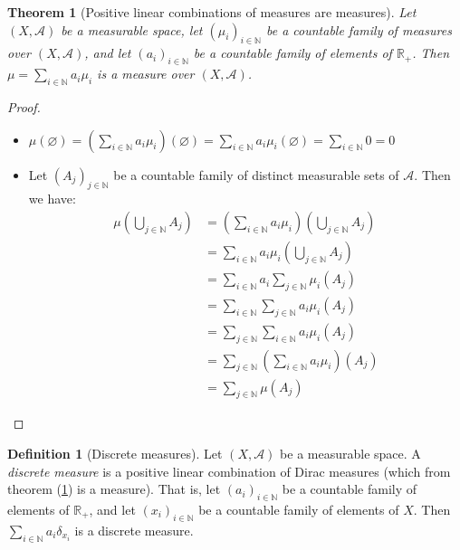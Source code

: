 \documentclass{article}
\newtheorem{theorem}{Theorem}[section]
\theoremstyle{definition}
\newtheorem{definition}{Definition}[section]
\theoremstyle{remark}
\theoremstyle{example}
\theoremstyle{notation}
\begin{document}
\begin{theorem}[Positive linear combinations of measures are measures] \label{thm:pos_lin_comb_measures}
    Let $(X, \mathcal{A})$ be a measurable space, let $(\mu_i)_{i \in \mathbb{N}}$ be a countable family of measures over $(X, \mathcal{A})$, and let $(a_i)_{i \in \mathbb{N}}$ be a countable family of elements of $\mathbb{R}_+$. Then $\mu = \sum_{i \in \mathbb{N}} a_i \mu_i$ is a measure over $(X, \mathcal{A})$.
\end{theorem}

\begin{proof}~
    \begin{itemize}
        \item $\mu(\varnothing) = \left(\sum_{i \in \mathbb{N}} a_i \mu_i\right)(\varnothing) = \sum_{i \in \mathbb{N}} a_i \mu_i(\varnothing) = \sum_{i \in \mathbb{N}} 0 = 0$
        \item Let $(A_j)_{j \in \mathbb{N}}$ be a countable family of distinct measurable sets of $\mathcal{A}$. Then we have:
        \begin{align*}
            \mu(\bigcup_{j \in \mathbb{N}} A_j) &= \left(\sum_{i \in \mathbb{N}} a_i \mu_i\right)(\bigcup_{j \in \mathbb{N}} A_j)\\
            &= \sum_{i \in \mathbb{N}} a_i \mu_i(\bigcup_{j \in \mathbb{N}} A_j)\\
            &= \sum_{i \in \mathbb{N}} a_i \sum_{j \in \mathbb{N}} \mu_i(A_j)\\
            &= \sum_{i \in \mathbb{N}} \sum_{j \in \mathbb{N}} a_i \mu_i(A_j)\\
            &= \sum_{j \in \mathbb{N}} \sum_{i \in \mathbb{N}} a_i \mu_i(A_j)\\
            &= \sum_{j \in \mathbb{N}} \left(\sum_{i \in \mathbb{N}} a_i \mu_i\right)(A_j)\\
            &= \sum_{j \in \mathbb{N}} \mu(A_j)
        \end{align*}
    \end{itemize}
\end{proof}

\begin{definition}[Discrete measures]
    Let $(X, \mathcal{A})$ be a measurable space. A \textit{discrete measure} is a positive linear combination of Dirac measures (which from theorem (\ref{thm:pos_lin_comb_measures}) is a measure). That is, let $(a_i)_{i \in \mathbb{N}}$ be a countable family of elements of $\mathbb{R}_+$, and let $(x_i)_{i \in \mathbb{N}}$ be a countable family of elements of $X$. Then $\sum_{i \in \mathbb{N}} a_i \delta_{x_i}$ is a discrete measure.
\end{definition}
\end{document}
